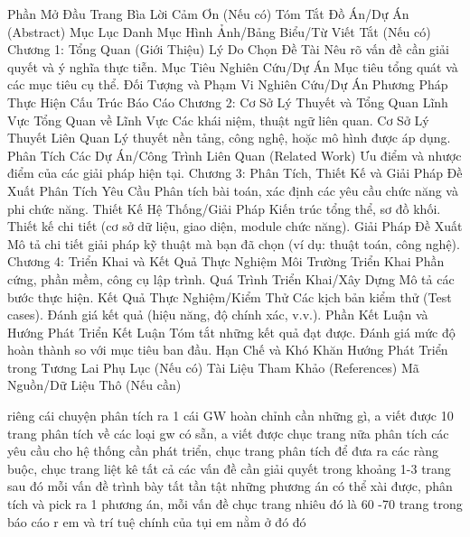 Phần Mở Đầu
Trang Bìa
Lời Cảm Ơn (Nếu có)
Tóm Tắt Đồ Án/Dự Án (Abstract)
Mục Lục
Danh Mục Hình Ảnh/Bảng Biểu/Từ Viết Tắt (Nếu có)
Chương 1: Tổng Quan (Giới Thiệu)
Lý Do Chọn Đề Tài
Nêu rõ vấn đề cần giải quyết và ý nghĩa thực tiễn.
Mục Tiêu Nghiên Cứu/Dự Án
Mục tiêu tổng quát và các mục tiêu cụ thể.
Đối Tượng và Phạm Vi Nghiên Cứu/Dự Án
Phương Pháp Thực Hiện
Cấu Trúc Báo Cáo
Chương 2: Cơ Sở Lý Thuyết và Tổng Quan Lĩnh Vực
Tổng Quan về Lĩnh Vực
Các khái niệm, thuật ngữ liên quan.
Cơ Sở Lý Thuyết Liên Quan
Lý thuyết nền tảng, công nghệ, hoặc mô hình được áp dụng.
Phân Tích Các Dự Án/Công Trình Liên Quan (Related Work)
Ưu điểm và nhược điểm của các giải pháp hiện tại.
Chương 3: Phân Tích, Thiết Kế và Giải Pháp Đề Xuất
Phân Tích Yêu Cầu
Phân tích bài toán, xác định các yêu cầu chức năng và phi chức năng.
Thiết Kế Hệ Thống/Giải Pháp
Kiến trúc tổng thể, sơ đồ khối.
Thiết kế chi tiết (cơ sở dữ liệu, giao diện, module chức năng).
Giải Pháp Đề Xuất
Mô tả chi tiết giải pháp kỹ thuật mà bạn đã chọn (ví dụ: thuật toán, công nghệ).
Chương 4: Triển Khai và Kết Quả Thực Nghiệm
Môi Trường Triển Khai
Phần cứng, phần mềm, công cụ lập trình.
Quá Trình Triển Khai/Xây Dựng
Mô tả các bước thực hiện.
Kết Quả Thực Nghiệm/Kiểm Thử
Các kịch bản kiểm thử (Test cases).
Đánh giá kết quả (hiệu năng, độ chính xác, v.v.).
Phần Kết Luận và Hướng Phát Triển
Kết Luận
Tóm tắt những kết quả đạt được.
Đánh giá mức độ hoàn thành so với mục tiêu ban đầu.
Hạn Chế và Khó Khăn
Hướng Phát Triển trong Tương Lai
Phụ Lục (Nếu có)
Tài Liệu Tham Khảo (References)
Mã Nguồn/Dữ Liệu Thô (Nếu cần)


riêng cái chuyện phân tích ra 1 cái GW hoàn chỉnh cần những gì, a viết được 10 trang
phân tích về các loại gw có sẵn, a viết được chục trang nữa
phân tích các yêu cầu cho hệ thống cần phát triển, chục trang
phân tích để đưa ra các ràng buộc, chục trang
liệt kê tất cả các vấn đề cần giải quyết trong khoảng 1-3 trang
sau đó mỗi vấn đề trình bày tất tần tật những phương án có thể xài được, phân tích và pick ra 1 phương án, mỗi vấn đề chục trang
nhiêu đó là 60 -70 trang trong báo cáo r em
và trí tuệ chính của tụi em nằm ở đó đó